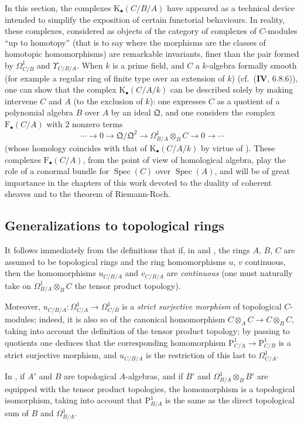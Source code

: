 \begin{remark}[20.6.26]
\label{0.20.6.26}
In this section, the complexes $\mathrm{K}_\bullet(C/B/A)$ have appeared as a technical device intended to simplify the exposition of certain functorial behaviours.
In reality, these complexes, considered as objects of the category of
complexes of $C$-modules ``up to homotopy'' (that is to say where the morphisms are the classes of homotopic homomorphisms) are remarkable invariants, finer than the pair formed by $\Omega^1_{C/B}$ and $\Upsilon_{C/B/A}$.
When $k$ is a prime field, and $C$ a $k$-algebra formally smooth (for example a regular ring of finite type over an extension of $k$) (cf.\ ($\mathbf{IV}$, 6.8.6)), one can show that the complex $\mathrm{K}_\bullet(C/A/k)$ can be described solely by making intervene $C$ and $A$ (to the exclusion of $k$): one expresses $C$ as a quotient of a polynomial algebra $B$ over $A$ by an ideal $\mathfrak{Q}$, and one considers the complex $\mathrm{F}_\bullet(C/A)$ with 2 nonzero terms
\[
  \cdots\to 0\to\mathfrak{Q}/\mathfrak{Q}^2\to\Omega^1_{B/A}\otimes_B C\to 0\to\cdots
\]
(whose homology coincides with that of $\mathrm{K}_\bullet(C/A/k)$ by virtue of ).
These complexes $\mathrm{F}_\bullet(C/A)$, from the point of view of homological algebra, play the role of a conormal bundle for $\operatorname{Spec}(C)$ over $\operatorname{Spec}(A)$, and will be of great importance in the chapters of this work devoted to the duality of coherent sheaves and to the theorem of Riemann-Roch.
\end{remark}

\subsection{Generalizations to topological rings}
\label{subsection:0.20.7}

\begin{env}[20.7.1]
\label{0.20.7.1}
It follows immediately from the definitions that if, in  and , the rings $A$, $B$, $C$ are assumed to be topological rings and the ring homomorphisms $u$, $v$ continuous, then the homomorphisms $u_{C/B/A}$ and $v_{C/B/A}$ are \emph{continuous} (one must naturally take on $\Omega^1_{B/A}\otimes_B C$ the tensor product topology).

Moreover, $u_{C/B/A}:\Omega^1_{C/A}\to\Omega^1_{C/B}$ is a \emph{strict surjective morphism} of topological $C$-modules; indeed, it is also so of the canonical homomorphism $C\otimes_A C\to C\otimes_B C$, taking into account the definition of the tensor product topology; by passing to quotients one deduces that the corresponding homomorphism $\mathrm{P}^1_{C/A}\to\mathrm{P}^1_{C/B}$ is a strict surjective morphism, and $u_{C/B/A}$ is the restriction of this last to $\Omega^1_{C/A}$.

In , if $A'$ and $B$ are topological $A$-algebras, and if $B'$ and $\Omega^1_{B/A}\otimes_B B'$ are equipped with the tensor product topologies, the homomorphism  is a topological isomorphism, taking into account that $\mathrm{P}^1_{B/A}$ is the same as the direct topological sum of $B$ and $\Omega^1_{B/A}$.
\end{env}

